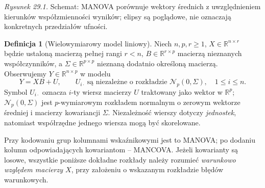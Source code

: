 \documentclass[11pt,a4paper,oneside]{report}
\numberwithin{equation}{chapter}
\theoremstyle{plain}
\theoremstyle{definition}
\newtheorem{definicja}{Definicja}[chapter]
\theoremstyle{remark}
\newcommand{\R}{\mathbb R}
\newcommand{\Normal}{\mathcal N}
\begin{document}
\begin{center}

{\small\emph{Rysunek 29.1.} Schemat: MANOVA porównuje wektory średnich z uwzględnieniem kierunków współzmienności wyników; elipsy są poglądowe, nie oznaczają konkretnych przedziałów ufności.}
\end{center}

\begin{definicja}[Wielowymiarowy model liniowy]\label{def:multivariate-linear}
Niech $n,p,r\ge1$, $X\in\R^{n\times r}$ będzie ustaloną macierzą pełnej rangi $r<n$, $B\in\R^{r\times p}$ macierzą nieznanych współczynników, a $\Sigma\in\R^{p\times p}$ nieznaną dodatnio określoną macierzą. Obserwujemy $Y\in\R^{n\times p}$ w modelu
\[
 Y=XB+U,\qquad U_{i\cdot}\ \text{są niezależne o rozkładzie }\Normal_p(0,\Sigma),\quad 1\le i\le n.
\]
Symbol $U_{i\cdot}$ oznacza $i$-ty wiersz macierzy $U$ traktowany jako wektor w $\R^p$; $\Normal_p(0,\Sigma)$ jest $p$-wymiarowym rozkładem normalnym o zerowym wektorze średniej i macierzy kowariancji $\Sigma$. Niezależność wierszy dotyczy \emph{jednostek}, natomiast współrzędne jednego wiersza mogą być skorelowane.
\end{definicja}

Przy kodowaniu grup kolumnami wskaźnikowymi jest to MANOVA; po dodaniu kolumn odpowiadających kowariantom -- MANCOVA. Jeżeli kowarianty są losowe, wszystkie poniższe dokładne rozkłady należy rozumieć \emph{warunkowo względem macierzy $X$}, przy założeniu o wskazanym rozkładzie błędów warunkowych.
\end{document}
